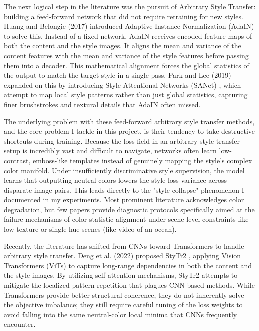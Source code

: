 \documentclass[12pt,letterpaper]{article}
\begin{document}
The next logical step in the literature was the pursuit of Arbitrary Style Transfer: building a feed-forward network that did not require retraining for new styles. Huang and Belongie (2017) introduced Adaptive Instance Normalization (AdaIN) \cite{huang2017} to solve this. Instead of a fixed network, AdaIN receives encoded feature maps of both the content and the style images. It aligns the mean and variance of the content features with the mean and variance of the style features before passing them into a decoder. This mathematical alignment forces the global statistics of the output to match the target style in a single pass. Park and Lee (2019) expanded on this by introducing Style-Attentional Networks (SANet) \cite{park2019}, which attempt to map local style patterns rather than just global statistics, capturing finer brushstrokes and textural details that AdaIN often missed.

The underlying problem with these feed-forward arbitrary style transfer methods, and the core problem I tackle in this project, is their tendency to take destructive shortcuts during training. Because the loss field in an arbitrary style transfer setup is incredibly vast and difficult to navigate, networks often learn low-contrast, emboss-like templates instead of genuinely mapping the style's complex color manifold. Under insufficiently discriminative style supervision, the model learns that outputting neutral colors lowers the style loss variance across disparate image pairs. This leads directly to the "style collapse" phenomenon I documented in my experiments. Most prominent literature acknowledges color degradation, but few papers provide diagnostic protocols specifically aimed at the failure mechanisms of color-statistic alignment under scene-level constraints like low-texture or single-hue scenes (like video of an ocean).

Recently, the literature has shifted from CNNs toward Transformers to handle arbitrary style transfer. Deng et al. (2022) proposed StyTr2 \cite{deng2022}, applying Vision Transformers (ViTs) to capture long-range dependencies in both the content and the style images. By utilizing self-attention mechanisms, StyTr2 attempts to mitigate the localized pattern repetition that plagues CNN-based methods. While Transformers provide better structural coherence, they do not inherently solve the objective imbalance; they still require careful tuning of the loss weights to avoid falling into the same neutral-color local minima that CNNs frequently encounter.
\end{document}
